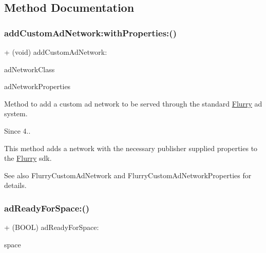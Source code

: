 \subsection{Method Documentation}
\mbox{\label{interfaceFlurryAds_a5990d1a5ce87ebc8b0ecf246cfcb6a4e}} 
\subsubsection{\texorpdfstring{add\+Custom\+Ad\+Network\+:with\+Properties\+:()}{addCustomAdNetwork:withProperties:()}}
{\footnotesize\ttfamily + (void) add\+Custom\+Ad\+Network\+: \begin{DoxyParamCaption}\item[{(Class$<$ Flurry\+Custom\+Ad\+Network $>$)}]{ad\+Network\+Class }\item[{withProperties:(id$<$ Flurry\+Custom\+Ad\+Network\+Properties $>$)}]{ad\+Network\+Properties }\end{DoxyParamCaption}}



Method to add a custom ad network to be served through the standard \hyperlink{interfaceFlurry}{Flurry} ad system. 

\begin{DoxySince}{Since}
4..
\end{DoxySince}
This method adds a network with the necessary publisher supplied properties to the \hyperlink{interfaceFlurry}{Flurry} sdk.

\begin{DoxySeeAlso}{See also}
{\ttfamily Flurry\+Custom\+Ad\+Network} and {\ttfamily Flurry\+Custom\+Ad\+Network\+Properties} for details. 
\end{DoxySeeAlso}
\mbox{\label{interfaceFlurryAds_a1f87cd568f71e77a9c89264b165d2164}} 
\subsubsection{\texorpdfstring{ad\+Ready\+For\+Space\+:()}{adReadyForSpace:()}}
{\footnotesize\ttfamily + (B\+O\+OL) ad\+Ready\+For\+Space\+: \begin{DoxyParamCaption}\item[{(N\+S\+String $\ast$)}]{space }\end{DoxyParamCaption}}



